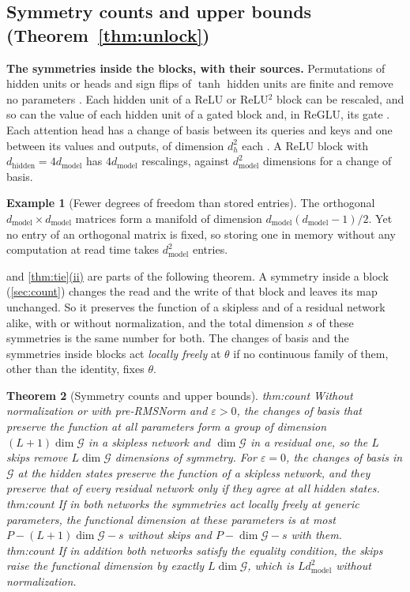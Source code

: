 \documentclass[10pt]{article}
\newtheorem{theorem}{Theorem}[section]
\theoremstyle{definition}
\newtheorem{example}[theorem]{Example}
\theoremstyle{remark}
\newcommand{\dm}{d_{\mathrm{model}}}
\newcommand{\dhid}{d_{\mathrm{hidden}}}
\newcommand{\G}{\mathcal{G}}
\newcommand{\para}[1]{\smallskip\noindent\textbf{#1}\hspace{0.5em}}
\newcommand{\ptlabel}[1]{\phantomsection\label{#1}}
\DeclareRobustCommand{\cpref}[2]{\hyperref[#1:#2]{\cref*{#1}(#2)}}
\newcommand{\stpart}[3]{\ifx\relax#1\relax\else\ptlabel{#1:#2}\fi{\upshape\bfseries\boldmath(#2)\ifx\relax#3\relax\else\ #3.\fi}}
\begin{document}
\subsection{Symmetry counts and upper bounds\texorpdfstring{ (Theorem~\ref*{thm:unlock})}{}}\label{app:prf-count}

\para{The symmetries inside the blocks, with their sources.} Permutations of hidden units or heads and sign flips of $\tanh$ hidden units are finite and remove no parameters \citep{hechtnielsen1989theory,sussmann1992,fefferman1994}. Each hidden unit of a ReLU or ReLU$^2$ block can be rescaled, and so can the value of each hidden unit of a gated block and, in ReGLU, its gate \citep{rolnick2020reverse,godfrey2022symmetries}. Each attention head has a change of basis between its queries and keys and one between its values and outputs, of dimension $d_h^2$ each \citep{elhage2021circuits,wang2025gauge,theus2025glmc}. A ReLU block with $\dhid = 4\dm$ has $4\dm$ rescalings, against $\dm^2$ dimensions for a change of basis.

\begin{example}[Fewer degrees of freedom than stored entries]\label{ex:orth}
The orthogonal $\dm\times\dm$ matrices form a manifold of dimension $\dm(\dm-1)/2$. Yet no entry of an orthogonal matrix is fixed, so storing one in memory without any computation at read time takes $\dm^2$ entries.
\end{example}

 and \cpref{thm:tie}{ii} are parts of the following theorem. A symmetry inside a block (\cref{sec:count}) changes the read and the write of that block and leaves its map unchanged. So it preserves the function of a skipless and of a residual network alike, with or without normalization, and the total dimension $s$ of these symmetries is the same number for both. The changes of basis and the symmetries inside blocks act \emph{locally freely} at $\theta$ if no continuous family of them, other than the identity, fixes $\theta$.
\begin{theorem}[Symmetry counts and upper bounds]\label{thm:count}
\stpart{thm:count}{i}{} Without normalization or with pre-RMSNorm and $\varepsilon > 0$, the changes of basis that preserve the function at all parameters form a group of dimension $(L+1)\dim\G$ in a skipless network and $\dim\G$ in a residual one, so the $L$ skips remove $L\dim\G$ dimensions of symmetry. For $\varepsilon = 0$, the changes of basis in $\G$ at the hidden states preserve the function of a skipless network, and they preserve that of every residual network only if they agree at all hidden states.\\
\stpart{thm:count}{ii}{} If in both networks the symmetries act locally freely at generic parameters, the functional dimension at these parameters is at most $P - (L+1)\dim\G - s$ without skips and $P - \dim\G - s$ with them.\\
\stpart{thm:count}{iii}{} If in addition both networks satisfy the equality condition, the skips raise the functional dimension by exactly $L\dim\G$, which is $L\dm^2$ without normalization.
\end{theorem}
\end{document}
